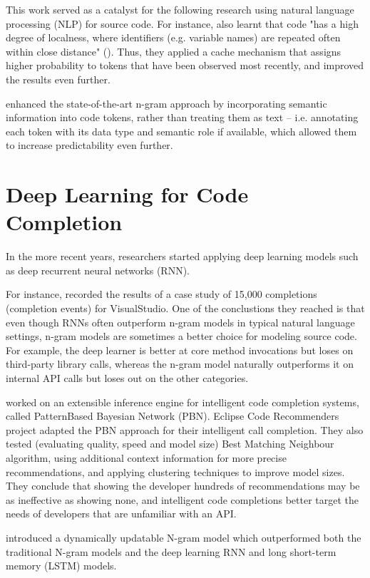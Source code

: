 This work served as a catalyst for the following research using natural language processing (NLP) for source code. For instance, \cite{Tu14a} also learnt that code "has a high degree of localness, where identifiers (e.g. variable names) are repeated often within close distance" (\cite{Alla18a}). Thus, they applied a cache mechanism that assigns higher probability to tokens that have been observed most recently, and improved the results even further.

\cite{Nguy13a} enhanced the state-of-the-art n-gram approach by incorporating semantic information into code tokens, rather than treating them as text -- i.e. annotating each token with its data type and semantic role if available, which allowed them to increase predictability even further.

\section{Deep Learning for Code Completion}
\label{sec:RelatedWorks-DeepLearning}
In the more recent years, researchers started applying deep learning models such as deep recurrent neural networks (RNN).

For instance, \cite{Hell19a} recorded the results of a case study of 15,000 completions (completion events) for VisualStudio. One of the conclustions they reached is that even though RNNs often outperform n-gram models in typical natural language settings, n-gram models are sometimes a better choice for modeling source code. For example, the deep learner is better at core method invocations but loses on third-party library calls, whereas the n-gram model naturally outperforms it on internal API calls but loses out on the other categories.

\cite{Prok15a} worked on an extensible inference engine for intelligent code completion systems, called PatternBased Bayesian Network (PBN). Eclipse Code Recommenders project adapted the PBN approach for their intelligent call completion. They also tested (evaluating quality, speed and model size) Best Matching Neighbour algorithm, using additional context information for more precise recommendations, and applying clustering techniques to improve model sizes. They conclude that showing the developer hundreds of recommendations may be as ineffective as showing none, and intelligent code completions better target the needs of developers that are unfamiliar with an API.

\cite{Hell17a} introduced a dynamically updatable N-gram model which outperformed both the traditional N-gram models and the deep learning RNN and long short-term memory (LSTM) models.

